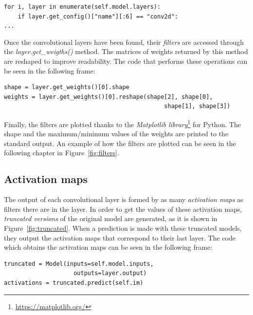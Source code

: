 \begin{lstlisting}
for i, layer in enumerate(self.model.layers):
	if layer.get_config()["name"][:6] == "conv2d":
...
\end{lstlisting}

Once the convolutional layers have been found, their \emph{filters} are accessed through the \textit{layer.get\_weigths()} method. The matrices of weights returned by this method are reshaped to improve readability. The code that performs these operations can be seen in the following frame:

\begin{lstlisting}
shape = layer.get_weights()[0].shape
weights = layer.get_weights()[0].reshape(shape[2], shape[0],
                                              shape[1], shape[3])
\end{lstlisting}

Finally, the filters are plotted thanks to the \emph{Matplotlib library}\footnote{\url{https://matplotlib.org/}} for Python. The shape and the maximum/minimum values of the weights are printed to the standard output. An example of how the filters are plotted can be seen in the following chapter in Figure~\ref{fig:filters}.

\subsection{Activation maps}
The output of each convolutional layer is formed by as many \emph{activation maps} as filters there are in the layer. In order to get the values of these activation maps, \emph{truncated versions} of the original model are generated, as it is shown in Figure~\ref{fig:truncated}. When a prediction is made with these truncated models, they output the activation maps that correspond to their last layer. The code which obtains the activation maps can be seen in the following frame:
\begin{lstlisting}
truncated = Model(inputs=self.model.inputs,
                    outputs=layer.output)
activations = truncated.predict(self.im)
\end{lstlisting}

